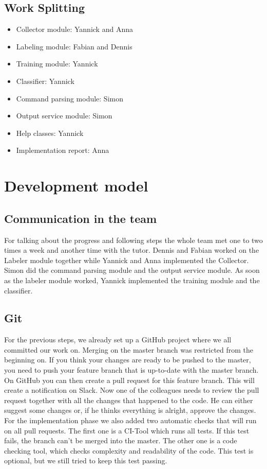 \documentclass[parskip=full]{scrartcl}
\begin{document}
\subsection{Work Splitting}
\begin{itemize}

\item Collector module: Yannick and Anna

\item Labeling module: Fabian and Dennis

\item Training module: Yannick

\item Classifier: Yannick

\item Command parsing module: Simon

\item Output service module: Simon

\item Help classes: Yannick

\item Implementation report: Anna

\end{itemize}


\section{Development model}
\subsection{Communication in the team}
For talking about the progress and following steps the whole team met one to two times a week and another time with the tutor.
Dennis and Fabian worked on the Labeler module together while Yannick and Anna implemented the Collector.
Simon did the command parsing module and the output service module.
As soon as the labeler module worked, Yannick implemented the training module and the classifier.
\subsection{Git}
For the previous steps, we already set up a GitHub project where we all committed our work on.
Merging on the master branch was restricted from the beginning on.
If you think your changes are ready to be pushed to the master, you need to push your feature branch that is up-to-date with the master branch.
On GitHub you can then create a pull request for this feature branch.
This will create a notification on Slack.
Now one of the colleagues needs to review the pull request together with all the changes that happened to the code.
He can either suggest some changes or, if he thinks everything is alright, approve the changes.
For the implementation phase we also added two automatic checks that will run on all pull requests.
The first one is a CI-Tool which runs all tests.
If this test fails, the branch can't be merged into the master.
The other one is a code checking tool, which checks complexity and readability of the code.
This test is optional, but we still tried to keep this test passing.
\end{document}

